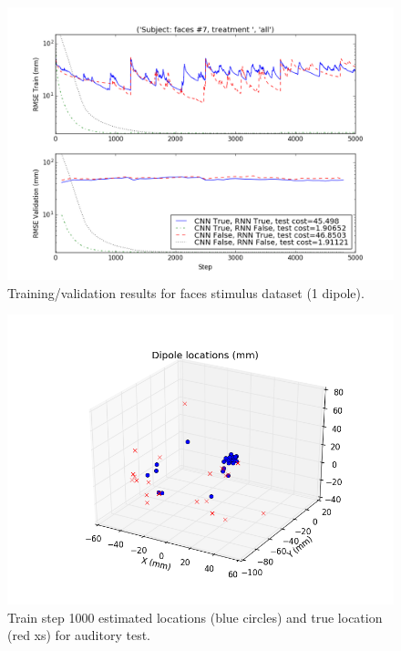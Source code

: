 \documentclass[journal,12pt,onecolumn,draftclsnofoot]{IEEEtran}
\begin{document}
\begin{figure}[h!]
\centering
\includegraphics[width=5in]{finalplots/faces1}
\caption{Training/validation results for faces stimulus dataset (1 dipole).}
\label{fig:faces}
\end{figure}


\begin{figure}[h!]
\centering
\includegraphics[width=5in]{finalplots/tf1_0_subject_aud_pca_all_True_rand_True_cnn_True_rnn_False_locate_1_treat_None_train_1000}
\caption{Train step 1000 estimated locations (blue circles) and true location (red xs) for auditory test.}
\label{fig:audloc}
\end{figure}
\end{document}
